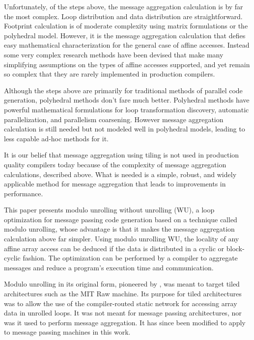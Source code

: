 Unfortunately, of the steps above, the message aggregation calculation is by far the most complex. Loop distribution and data distribution are straightforward. Footprint calculation is of moderate complexity using matrix formulations or the polyhedral model. However, it is the message aggregation calculation that defies easy mathematical characterization for the general case of affine accesses. Instead some very complex research methods \cite{goumas2006message, xue1997communication} have been devised that make many simplifying assumptions on the types of affine accesses supported, and yet remain so complex that they are rarely implemented in production compilers.

Although the steps above are primarily for traditional methods of parallel code generation, polyhedral methods don't fare much better. Polyhedral methods have powerful mathematical formulations for loop transformation discovery, automatic parallelization, and parallelism coarsening. However message aggregation calculation is still needed but not modeled well in polyhedral models, leading to less capable ad-hoc methods for it.

It is our belief that message aggregation using tiling is not used in production quality compilers today because of the complexity of message aggregation calculations, described above. What is needed is a simple, robust, and widely applicable method for message aggregation that leads to improvements in performance. 

This paper presents modulo unrolling without unrolling (WU), a loop optimization for message passing code generation based on a technique called modulo unrolling, whose advantage is that it makes the message aggregation calculation above far simpler. Using modulo unrolling WU, the locality of any affine array access can be deduced if the data is distributed in a cyclic or block-cyclic fashion. The optimization can be performed by a compiler to aggregate messages and reduce a program's execution time and communication. 

Modulo unrolling in its original form, pioneered by \cite{barua1999maps}, was meant to target tiled architectures such as the MIT Raw machine. Its purpose for tiled architectures was to allow the use of the compiler-routed static network for accessing array data in unrolled loops. It was not meant for message passing architectures, nor was it used to perform message aggregation. It has since been modified to apply to message passing machines in this work. 

